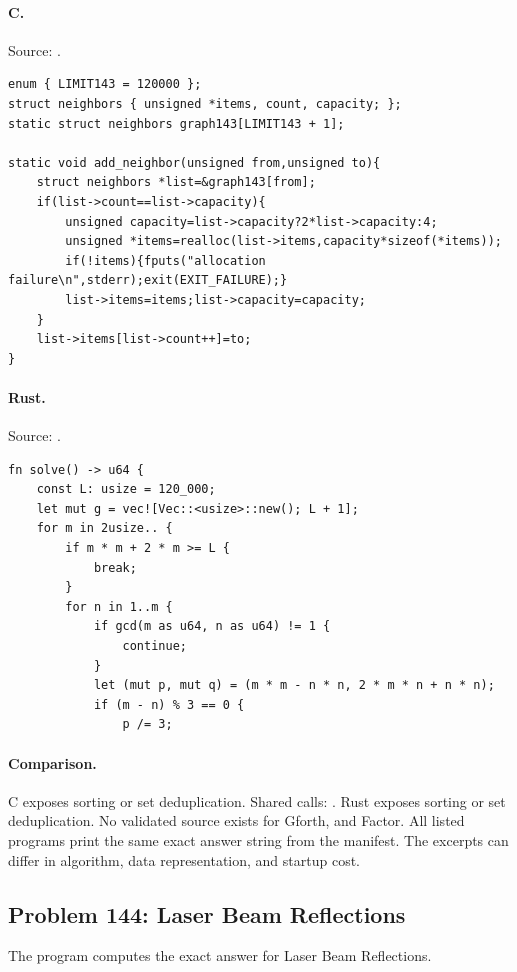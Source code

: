 \paragraph{C.} Source: .
\begin{lstlisting}
enum { LIMIT143 = 120000 };
struct neighbors { unsigned *items, count, capacity; };
static struct neighbors graph143[LIMIT143 + 1];

static void add_neighbor(unsigned from,unsigned to){
    struct neighbors *list=&graph143[from];
    if(list->count==list->capacity){
        unsigned capacity=list->capacity?2*list->capacity:4;
        unsigned *items=realloc(list->items,capacity*sizeof(*items));
        if(!items){fputs("allocation failure\n",stderr);exit(EXIT_FAILURE);}
        list->items=items;list->capacity=capacity;
    }
    list->items[list->count++]=to;
}
\end{lstlisting}

\paragraph{Rust.} Source: .
\begin{lstlisting}
fn solve() -> u64 {
    const L: usize = 120_000;
    let mut g = vec![Vec::<usize>::new(); L + 1];
    for m in 2usize.. {
        if m * m + 2 * m >= L {
            break;
        }
        for n in 1..m {
            if gcd(m as u64, n as u64) != 1 {
                continue;
            }
            let (mut p, mut q) = (m * m - n * n, 2 * m * n + n * n);
            if (m - n) % 3 == 0 {
                p /= 3;
\end{lstlisting}

\paragraph{Comparison.}
C exposes sorting or set deduplication. Shared calls: \texttt{}. Rust exposes sorting or set deduplication.
No validated source exists for Gforth, and Factor.
All listed programs print the same exact answer string from the manifest. The excerpts can differ in algorithm, data representation, and startup cost.

\subsection{Problem 144: Laser Beam Reflections}
\label{walkthrough:p144}
The program computes the exact answer for Laser Beam Reflections.

